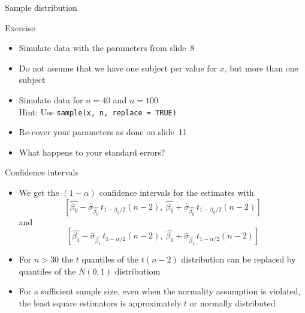 \documentclass[aspectratio=169]{beamer}
\begin{document}
\begin{frame}{Sample distribution}
  \begin{center}
  \end{center}
\end{frame}

\begin{frame}{}
  \begin{block}{Exercise}
    \begin{itemize}
      \item Simulate data with the parameters from slide~8
      \item Do not assume that we have one subject per value for $x$, but
        more than one subject
      \item Simulate data for $n=40$ and $n=100$\\
        Hint: Use \texttt{sample(x, n, replace = TRUE)}
      \item Re-cover your parameters as done on slide~11
      \item What happens to your standard errors?
    \end{itemize}
  \end{block}
\end{frame}

\begin{frame}{Confidence intervals}
  \begin{itemize}
    \item We get the $(1-\alpha)$ confidence intervals for the estimates with
\[
  \left[\hat{\beta_0} - \hat{\sigma}_{\hat{\beta_0}} \, t_{1-\beta_0/2} (n-2),~
  \hat{\beta_0} + \hat{\sigma}_{\hat{\beta_0}} \, t_{1-\beta_0/2} (n-2)\right]
\]
and
\[
  \left[\hat{\beta_1} - \hat{\sigma}_{\hat{\beta_1}} \, t_{1-\alpha/2} (n-2),~
  \hat{\beta_1} + \hat{\sigma}_{\hat{\beta_1}} \, t_{1-\alpha/2} (n-2)\right]
\]
  \item For $n > 30$ the $t$ quantiles of the $t(n-2)$ distribution can be
    replaced by quantiles of the $N(0,1)$ distributiom

  \item For a sufficient sample size, even when the normality assumption is
    violated, the least square estimators is approximately $t$ or normally
      distributed
  \end{itemize}
\end{frame}
\end{document}
